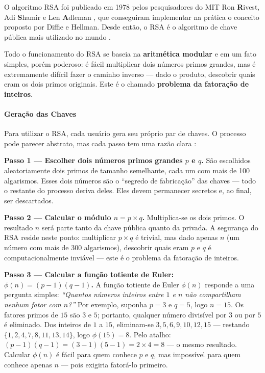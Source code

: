 O algoritmo RSA foi publicado em 1978 pelos pesquisadores do MIT Ron \textbf{R}ivest, Adi \textbf{S}hamir e Len \textbf{A}dleman \cite{rivest1978}, que conseguiram implementar na prática o conceito proposto por Diffie e Hellman. Desde então, o RSA é o algoritmo de chave pública mais utilizado no mundo \cite{tomaz2014}.

Todo o funcionamento do RSA se baseia na \textbf{aritmética modular} e em um fato simples, porém poderoso: é fácil multiplicar dois números primos grandes, mas é extremamente difícil fazer o caminho inverso --- dado o produto, descobrir quais eram os dois primos originais. Este é o chamado \textbf{problema da fatoração de inteiros}.

\paragraph{Geração das Chaves}

Para utilizar o RSA, cada usuário gera seu próprio par de chaves. O processo pode parecer abstrato, mas cada passo tem uma razão clara \cite{tomaz2014, stallings2008}:

\textbf{Passo 1 --- Escolher dois números primos grandes $p$ e $q$.} São escolhidos aleatoriamente dois primos de tamanho semelhante, cada um com mais de 100 algarismos. Esses dois números são o ``segredo de fabricação'' das chaves --- todo o restante do processo deriva deles. Eles devem permanecer secretos e, ao final, ser descartados.

\textbf{Passo 2 --- Calcular o módulo $n = p \times q$.} Multiplica-se os dois primos. O resultado $n$ será parte tanto da chave pública quanto da privada. A segurança do RSA reside neste ponto: multiplicar $p \times q$ é trivial, mas dado apenas $n$ (um número com mais de 300 algarismos), descobrir quais eram $p$ e $q$ é computacionalmente inviável --- este é o problema da fatoração de inteiros.

\textbf{Passo 3 --- Calcular a função totiente de Euler: $\phi(n) = (p-1)(q-1)$.} A função totiente de Euler $\phi(n)$ responde a uma pergunta simples: \textit{``Quantos números inteiros entre $1$ e $n$ não compartilham nenhum fator com $n$?''} Por exemplo, suponha $p = 3$ e $q = 5$, logo $n = 15$. Os fatores primos de $15$ são $3$ e $5$; portanto, qualquer número divisível por $3$ ou por $5$ é eliminado. Dos inteiros de $1$ a $15$, eliminam-se $3, 5, 6, 9, 10, 12, 15$ --- restando $\{1, 2, 4, 7, 8, 11, 13, 14\}$, logo $\phi(15) = 8$. Pelo atalho: $(p-1)(q-1) = (3-1)(5-1) = 2 \times 4 = 8$ --- o mesmo resultado. Calcular $\phi(n)$ é fácil para quem conhece $p$ e $q$, mas impossível para quem conhece apenas $n$ --- pois exigiria fatorá-lo primeiro.

